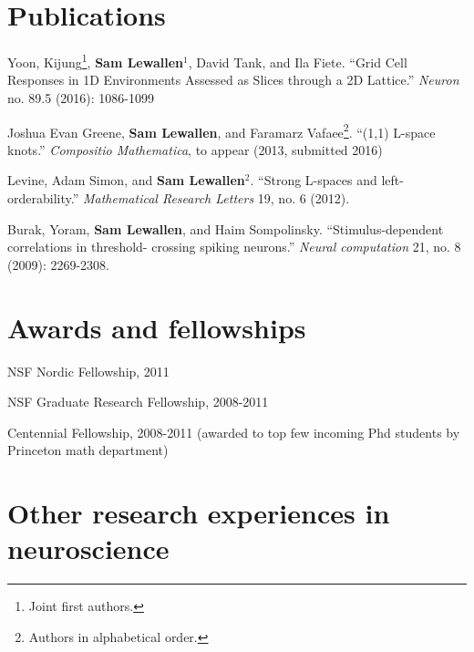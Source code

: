 \documentclass[letterpaper]{article}
\renewenvironment{itemize}{
  \begin{list}{}{
    \setlength{\leftmargin}{1.5em}
  }
}{
  \end{list}
}
\begin{document}
\section*{Publications}

\begin{itemize}

\item Yoon, Kijung\footnote{\label{note1}Joint first authors.}, \textbf{Sam Lewallen}$^{1}$, David Tank, and Ila Fiete. ``Grid Cell Responses in 1D Environments Assessed as Slices through a 2D Lattice.'' \textit{Neuron} no. 89.5 (2016): 1086-1099 %

\item Joshua Evan Greene, \textbf{Sam Lewallen}, and Faramarz Vafaee\footnote{Authors in alphabetical order.}. ``(1,1) L-space knots.'' \textit{Compositio Mathematica}, to appear (2013, submitted 2016)

\item Levine, Adam Simon, and \textbf{Sam Lewallen}$^{2}$. ``Strong L-spaces and left-orderability.'' \textit{Mathematical Research Letters} 19, no. 6 (2012).

\item Burak, Yoram, \textbf{Sam Lewallen}, and Haim Sompolinsky. ``Stimulus-dependent correlations in threshold- crossing spiking neurons.'' \textit{Neural computation} 21, no. 8 (2009): 2269-2308.

\end{itemize}

\section*{Awards and fellowships}

\begin{itemize}
\item NSF Nordic Fellowship, 2011 
\item NSF Graduate Research Fellowship, 2008-2011 
\item Centennial Fellowship, 2008-2011 (awarded to top few incoming Phd students by Princeton math department) 
\end{itemize}

\section*{Other research experiences in neuroscience}
\end{document}

